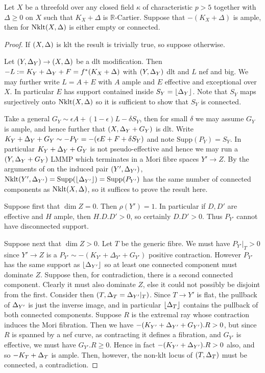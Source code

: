 \begin{theorem}
	Let $X$ be a threefold over any closed field $\kappa$ of characteristic $p>5$ together with $\Delta\geq 0$ on $X$ such that $K_{X}+\Delta$ is $\mathbb{R}$-Cartier. Suppose that $-(K_{X}+\Delta)$ is ample, then for $\text{Nklt}(X,\Delta)$ is either empty or connected. 
\end{theorem}
\begin{proof}
	If $(X,\Delta)$ is klt the result is trivially true, so suppose otherwise.
	
	Let $(Y,\Delta_{Y}) \to (X,\Delta)$ be a dlt modification. Then $-L:=K_{Y}+\Delta_{Y}+F=f^{*}(K_{X}+\Delta)$ with $(Y,\Delta_{Y})$ dlt and $L$ nef and big. We may further write $L=A+E$ with $A$ ample and $E$ effective and exceptional over $X$. In particular $E$ has support contained inside $S_{Y}=\lfloor \Delta_{Y} \rfloor$. Note that $S_{Y}$ maps surjectively onto $\text{Nklt}(X,\Delta)$ so it is sufficient to show that $S_{Y}$ is connected.
	
	Take a general $G_{Y} \sim \epsilon A +(1-\epsilon) L-\delta S_{Y}$, then for small $\delta$ we may assume $G_{Y}$ is ample, and hence further that $(X,\Delta_{Y}+G_{Y})$ is dlt. Write $K_{Y}+\Delta_{Y}+G_{Y}\sim - P_{Y}=-(\epsilon E + F + \delta S_{Y})$ and note $\text{Supp}(P_{Y})=S_{Y}$. In particular $K_{Y}+\Delta_{Y}+G_{Y}$ is not pseudo-effective and hence we may run a $(Y,\Delta_{Y}+G_{Y})$ LMMP which terminates in a Mori fibre spaces $Y' \to Z$. By the arguments of \cite[Theorem 9.3]{Bir16} on the induced pair $(Y',\Delta_{Y'})$, $\text{Nklt}(Y',\Delta_{Y'})=\text{Supp}(\lfloor \Delta_{Y'} \rfloor)=\text{Supp}(P_{Y'})$ has the same number of connected components as $\text{Nklt}(X,\Delta)$, so it suffices to prove the result here.
	
	Suppose first that $\dim Z=0$. Then $\rho(Y')=1$. In particular if $D,D'$ are effective and $H$ ample, then $H.D.D' >0$, so certainly $D.D'>0$. Thus $P_{Y'}$ cannot have disconnected support.
	
	Suppose next that $\dim Z > 0 $. Let $T$ be the generic fibre. We must have $P_{Y'}|_{T}> 0$ since $Y' \to Z$ is a $P_{Y'}\sim -(K_{Y'}+\Delta_{Y'}+G_{Y'})$ positive contraction. However $P_{Y'}$ has the same support as $\lfloor \Delta_{Y'} \rfloor$ so at least one connected component must dominate $Z$. Suppose then, for contradiction, there is a second connected component. Clearly it must also dominate $Z$, else it could not possibly be disjoint from the first. Consider then $(T,\Delta_{T}=\Delta_{Y'}|_{T})$. Since $T \to Y'$ is flat, the pullback of $\Delta_{Y'}$ is just the inverse image, and in particular $\lfloor \Delta_{T} \rfloor$ contains the pullback of both connected components. Suppose $R$ is the extremal ray whose contraction induces the Mori fibration. Then we have $-(K_{Y'}+\Delta_{Y'}+G_{Y'}).R >0$, but since $R$ is spanned by a nef curve, as contracting it defines a fibration, and $G_{Y'}$ is effective, we must have $G_{Y'}.R \geq 0$. Hence in fact $-(K_{Y'}+\Delta_{Y'}).R >0$ also, and so $-K_{T}+\Delta_{T}$ is ample. Then, however, the non-klt locus of $(T,\Delta_{T})$ must be connected, a contradiction.
\end{proof}
	
